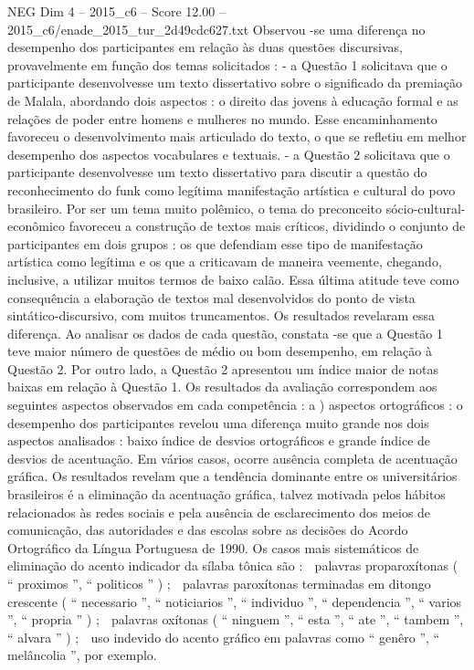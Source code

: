 \begin{textsample}{NEG Dim 4 – 2015\_c6 – Score 12.00 – 2015\_c6/enade\_2015\_tur\_2d49cdc627.txt}
Observou -se uma diferença no desempenho dos participantes em relação às duas questões discursivas, provavelmente em função dos temas solicitados : - a Questão 1 solicitava que o participante desenvolvesse um texto dissertativo sobre o significado da premiação de Malala, abordando dois aspectos : o direito das jovens à educação formal e as relações de poder entre homens e mulheres no mundo.
Esse encaminhamento favoreceu o desenvolvimento mais articulado do texto, o que se refletiu em melhor desempenho dos aspectos vocabulares e textuais. - a Questão 2 solicitava que o participante desenvolvesse um texto dissertativo para discutir a questão do reconhecimento do funk como legítima manifestação artística e cultural do povo brasileiro.
Por ser um tema muito polêmico, o tema do preconceito sócio-cultural-econômico favoreceu a construção de textos mais críticos, dividindo o conjunto de participantes em dois grupos : os que defendiam esse tipo de manifestação artística como legítima e os que a criticavam de maneira veemente, chegando, inclusive, a utilizar muitos termos de baixo calão.
Essa última atitude teve como consequência a elaboração de textos mal desenvolvidos do ponto de vista sintático-discursivo, com muitos truncamentos.
Os resultados revelaram essa diferença.
Ao analisar os dados de cada questão, constata -se que a Questão 1 teve maior número de questões de médio ou bom desempenho, em relação à Questão 2.
Por outro lado, a Questão 2 apresentou um índice maior de notas baixas em relação à Questão 1.
Os resultados da avaliação correspondem aos seguintes aspectos observados em cada competência : a ) aspectos ortográficos : o desempenho dos participantes revelou uma diferença muito grande nos dois aspectos analisados : baixo índice de desvios ortográficos e grande índice de desvios de acentuação.
Em vários casos, ocorre ausência completa de acentuação gráfica.
Os resultados revelam que a tendência dominante entre os universitários brasileiros é a eliminação da acentuação gráfica, talvez motivada pelos hábitos relacionados às redes sociais e pela ausência de esclarecimento dos meios de comunicação, das autoridades e das escolas sobre as decisões do Acordo Ortográfico da Língua Portuguesa de 1990.
Os casos mais sistemáticos de eliminação do acento indicador da sílaba tônica são :  palavras proparoxítonas ( “ proximos ”, “ politicos ” ) ;  palavras paroxítonas terminadas em ditongo crescente ( “ necessario ”, “ noticiarios ”, “ individuo ”, “ dependencia ”, “ varios ”, “ propria ” ) ;  palavras oxítonas ( “ ninguem ”, “ esta ”, “ ate ”, “ tambem ”, “ alvara ” ) ;  uso indevido do acento gráfico em palavras como “ genêro ”, “ melâncolia ”, por exemplo.

\end{textsample}
